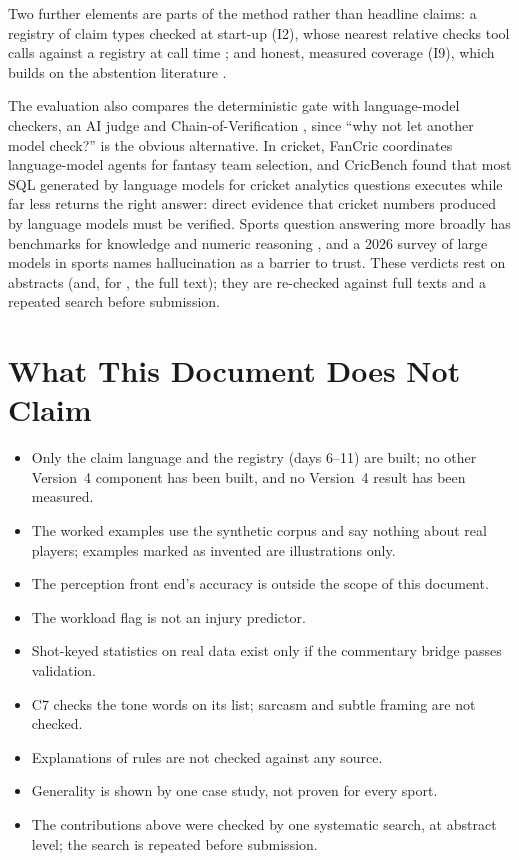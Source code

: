 \documentclass[11pt,a4paper]{article}
\begin{document}
\noindent Two further elements are parts of the method rather than headline
claims: a registry of claim types checked at start-up (I2), whose nearest
relative checks tool calls against a registry at call time \cite{closedworld};
and honest, measured coverage (I9), which builds on the abstention literature
\cite{abstention}.

\noindent The evaluation also compares the deterministic gate with
language-model checkers, an AI judge \cite{llmjudge} and Chain-of-Verification
\cite{cove}, since ``why not let another model check?'' is the obvious
alternative. In cricket, FanCric \cite{fancric} coordinates language-model agents
for fantasy team selection, and CricBench \cite{cricbench} found that most SQL
generated by language models for cricket analytics questions executes while far
less returns the right answer: direct evidence that cricket numbers produced by
language models must be verified. Sports question answering more broadly has
benchmarks for knowledge and numeric reasoning \cite{sportqa,sportsmetrics}, and
a 2026 survey of large models in sports \cite{sportsurvey} names hallucination as
a barrier to trust. These verdicts rest on abstracts (and, for \cite{thomson}, the
full text); they are re-checked against full texts and a repeated search before
submission.

\section{What This Document Does Not Claim}

\begin{itemize}[nosep,leftmargin=1.6em]
\item Only the claim language and the registry (days 6--11) are built; no other Version~4
  component has been built, and no Version~4 result has been measured.
\item The worked examples use the synthetic corpus and say nothing about real
  players; examples marked as invented are illustrations only.
\item The perception front end's accuracy is outside the scope of this document.
\item The workload flag is not an injury predictor.
\item Shot-keyed statistics on real data exist only if the commentary bridge
  passes validation.
\item C7 checks the tone words on its list; sarcasm and subtle framing are not
  checked.
\item Explanations of rules are not checked against any source.
\item Generality is shown by one case study, not proven for every sport.
\item The contributions above were checked by one systematic search, at abstract
  level; the search is repeated before submission.
\end{itemize}
\end{document}
